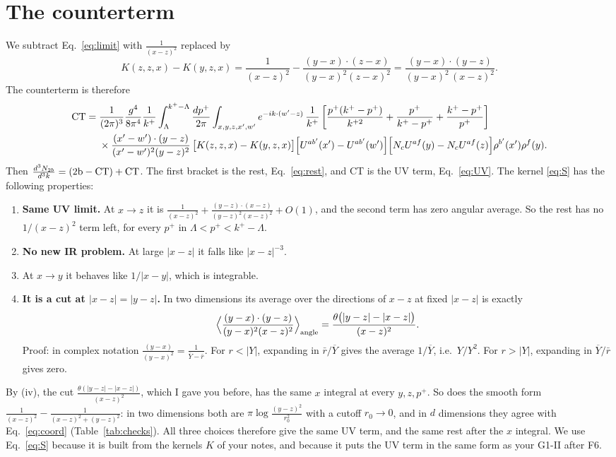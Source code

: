 \documentclass[10pt]{article}
\numberwithin{equation}{section}
\begin{document}
\section{The counterterm}\label{sec:ct}
We subtract Eq.~\eqref{eq:limit} with $\frac{1}{(x-z)^2}$ replaced by
\begin{equation}
K(z,z,x)-K(y,z,x)=\frac{1}{(x-z)^2}-\frac{(y-x)\cdot(z-x)}{(y-x)^2(z-x)^2}=\frac{(y-x)\cdot(y-z)}{(y-x)^{2}\,(x-z)^{2}}.
\label{eq:S}
\end{equation}
The counterterm is therefore
\begin{align}
{\rm CT}={}&\frac{1}{(2\pi)^{3}}\frac{g^{4}}{8\pi^{4}}\frac{1}{k^{+}}\int_{\Lambda}^{k^+-\Lambda}\frac{dp^+}{2\pi}\int_{x,y,z,x',w'}e^{-ik\cdot(w'-z)}\,\frac{1}{k^{+}}\left[\frac{p^{+}(k^{+}-p^{+})}{k^{+2}}+\frac{p^{+}}{k^{+}-p^{+}}+\frac{k^{+}-p^{+}}{p^{+}}\right]\notag\\
&\times\frac{(x'-w')\cdot(y-z)}{(x'-w')^{2}(y-z)^{2}}\,\big[K(z,z,x)-K(y,z,x)\big]\Big[U^{ab'}(x')-U^{ab'}(w')\Big]\Big[N_cU^{af}(y)-N_cU^{af}(z)\Big]\rho^{b'}(x')\rho^{f}(y).
\label{eq:CT}
\end{align}
Then $\frac{d^3N_{2b}}{d^3k}=({\rm 2b}-{\rm CT})+{\rm CT}$. The first bracket is the rest, Eq.~\eqref{eq:rest}, and CT is the UV term, Eq.~\eqref{eq:UV}. The kernel \eqref{eq:S} has the following properties:
\begin{enumerate}
\item[(i)] \textbf{Same UV limit.} At $x\to z$ it is $\frac{1}{(x-z)^2}+\frac{(y-z)\cdot(x-z)}{(y-z)^2(x-z)^2}+O(1)$, and the second term has zero angular average. So the rest has no $1/(x-z)^2$ term left, for every $p^+$ in $\Lambda<p^+<k^+-\Lambda$.
\item[(ii)] \textbf{No new IR problem.} At large $|x-z|$ it falls like $|x-z|^{-3}$.
\item[(iii)] At $x\to y$ it behaves like $1/|x-y|$, which is integrable.
\item[(iv)] \textbf{It is a cut at $|x-z|=|y-z|$.} In two dimensions its average over the directions of $x-z$ at fixed $|x-z|$ is exactly
\begin{equation}
\Big\langle\frac{(y-x)\cdot(y-z)}{(y-x)^{2}(x-z)^{2}}\Big\rangle_{\rm angle}=\frac{\theta\big(|y-z|-|x-z|\big)}{(x-z)^{2}}.
\label{eq:angle}
\end{equation}
Proof: in complex notation $\frac{(y-x)}{(y-x)^2}=\frac{1}{\overline{Y}-\bar r}$. For $r<|Y|$, expanding in $\bar r/\overline Y$ gives the average $1/\overline Y$, i.e.\ $Y/Y^2$. For $r>|Y|$, expanding in $\overline Y/\bar r$ gives zero.
\end{enumerate}
By (iv), the cut $\frac{\theta(|y-z|-|x-z|)}{(x-z)^2}$, which I gave you before, has the same $x$ integral at every $y,z,p^+$. So does the smooth form $\frac{1}{(x-z)^2}-\frac{1}{(x-z)^2+(y-z)^2}$: in two dimensions both are $\pi\log\frac{(y-z)^2}{r_0^2}$ with a cutoff $r_0\to0$, and in $d$ dimensions they agree with Eq.~\eqref{eq:coord} (Table~\ref{tab:checks}). All three choices therefore give the same UV term, and the same rest after the $x$ integral. We use Eq.~\eqref{eq:S} because it is built from the kernels $K$ of your notes, and because it puts the UV term in the same form as your G1-II after F6.
\end{document}
